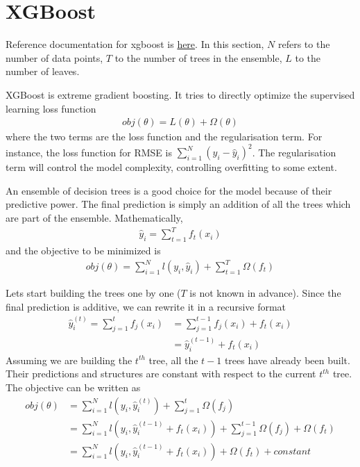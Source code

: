 \documentclass[../statistical_learning_notes.tex]{subfiles}
\begin{document}
\section{XGBoost}
Reference documentation for xgboost is \href{https://xgboost.readthedocs.io/en/latest/tutorials/model.html}{here}.
In this section, $N$ refers to the number of data points, $T$ to the number of trees in the ensemble, $L$ to the number of leaves.\newline

XGBoost is extreme gradient boosting. It tries to directly optimize the supervised learning loss function
\begin{align*}
     obj(\theta) = L(\theta) + \Omega(\theta)
\end{align*} 
where the two terms are the loss function and the regularisation term. For instance, the loss function for RMSE is $\sum_{i=1}^{N} (y_{i} - \hat{y}_{i})^{2}$. The regularisation term will control the model complexity, controlling overfitting to some extent.\newline

An ensemble of decision trees is a good choice for the model because of their predictive power. The final prediction is simply an addition of all the trees which are part of the ensemble. Mathematically,
\begin{align*}
    \hat{y}_{i} = \sum_{t=1}^{T} f_{t}(x_{i})
\end{align*}
and the objective to be minimized is
\begin{align*}
    obj(\theta) = \sum_{i=1}^{N} l(y_{i}, \hat{y}_{i}) + \sum_{t=1}^{T} \Omega(f_{t})
\end{align*}

Lets start building the trees one by one ($T$ is not known in advance). Since the final prediction is additive, we can rewrite it in a recursive format
\begin{align*}
    \hat{y}_{i}^{(t)} = \sum_{j=1}^{t} f_{j}(x_{i}) &= \sum_{j=1}^{t-1} f_{j}(x_{i}) + f_{t}(x_{i}) \\
    &= \hat{y}_{i}^{(t-1)} + f_{t}(x_{i})
\end{align*}
Assuming we are building the $t^{th}$ tree, all the $t-1$ trees have already been built. Their predictions and structures are constant with respect to the current $t^{th}$ tree. The objective can be written as
\begin{align*}
    obj(\theta) &= \sum_{i=1}^{N} l(y_{i}, \hat{y}^{(t)}_{i}) + \sum_{j=1}^{t} \Omega(f_{j}) \\
    &= \sum_{i=1}^{N} l(y_{i}, \hat{y}^{(t-1)}_{i} + f_{t}(x_{i})) + \sum_{j=1}^{t-1} \Omega(f_{j}) + \Omega(f_{t}) \\
    &= \sum_{i=1}^{N} l(y_{i}, \hat{y}^{(t-1)}_{i} + f_{t}(x_{i})) + \Omega(f_{t}) + constant
\end{align*}
\end{document}
